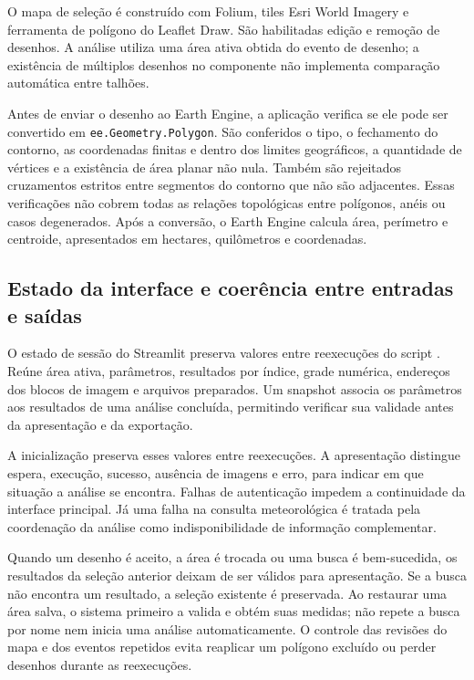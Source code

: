 O mapa de seleção é construído com Folium, tiles Esri World Imagery e ferramenta de polígono do Leaflet Draw. São habilitadas edição e remoção de desenhos. A análise utiliza uma área ativa obtida do evento de desenho; a existência de múltiplos desenhos no componente não implementa comparação automática entre talhões.

Antes de enviar o desenho ao Earth Engine, a aplicação verifica se ele pode ser convertido em \texttt{ee.Geometry.Polygon}. São conferidos o tipo, o fechamento do contorno, as coordenadas finitas e dentro dos limites geográficos, a quantidade de vértices e a existência de área planar não nula. Também são rejeitados cruzamentos estritos entre segmentos do contorno que não são adjacentes. Essas verificações não cobrem todas as relações topológicas entre polígonos, anéis ou casos degenerados. Após a conversão, o Earth Engine calcula área, perímetro e centroide, apresentados em hectares, quilômetros e coordenadas.

\subsection{Estado da interface e coerência entre entradas e saídas}

O estado de sessão do Streamlit preserva valores entre reexecuções do script \citep{STREAMLIT_STATE}. Reúne área ativa, parâmetros, resultados por índice, grade numérica, endereços dos blocos de imagem e arquivos preparados. Um snapshot associa os parâmetros aos resultados de uma análise concluída, permitindo verificar sua validade antes da apresentação e da exportação.

A inicialização preserva esses valores entre reexecuções. A apresentação distingue espera, execução, sucesso, ausência de imagens e erro, para indicar em que situação a análise se encontra. Falhas de autenticação impedem a continuidade da interface principal. Já uma falha na consulta meteorológica é tratada pela coordenação da análise como indisponibilidade de informação complementar.

Quando um desenho é aceito, a área é trocada ou uma busca é bem-sucedida, os resultados da seleção anterior deixam de ser válidos para apresentação. Se a busca não encontra um resultado, a seleção existente é preservada. Ao restaurar uma área salva, o sistema primeiro a valida e obtém suas medidas; não repete a busca por nome nem inicia uma análise automaticamente. O controle das revisões do mapa e dos eventos repetidos evita reaplicar um polígono excluído ou perder desenhos durante as reexecuções.

